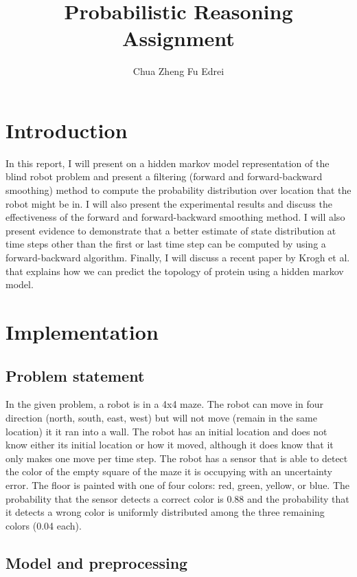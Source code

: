 \documentclass[9.5pt]{extarticle}
\title{Probabilistic Reasoning Assignment}
\author{Chua Zheng Fu Edrei}
\begin{document}
\maketitle

\section{Introduction}

In this report, I will present on a hidden markov model representation of the blind robot problem and present a filtering (forward and forward-backward smoothing) method to compute the probability distribution over location that the robot might be in. I will also present the experimental results and discuss the effectiveness of the forward and forward-backward smoothing method. I will also present evidence to demonstrate that a better estimate of state distribution at time steps other than the first or last time step can be computed by using a forward-backward algorithm. Finally, I will discuss a recent paper by Krogh et al. that explains how we can predict the topology of protein using a hidden markov model.


\section{Implementation}

\subsection{Problem statement}
In the given problem, a robot is in a 4x4 maze. The robot can move in four direction (north, south, east, west) but will not move (remain in the same location) it it ran into a wall. The robot has an initial location and does not know either its initial location or how it moved, although it does know that it only makes one move per time step. The robot has a sensor that is able to detect the color of the empty square of the maze it is occupying with an uncertainty error. The floor is painted with one of four colors: red, green, yellow, or blue. The probability that the sensor detects a correct color is 0.88 and the probability that it detects a wrong color is uniformly distributed among the three remaining colors (0.04 each).

\subsection{Model and preprocessing}
\end{document}
